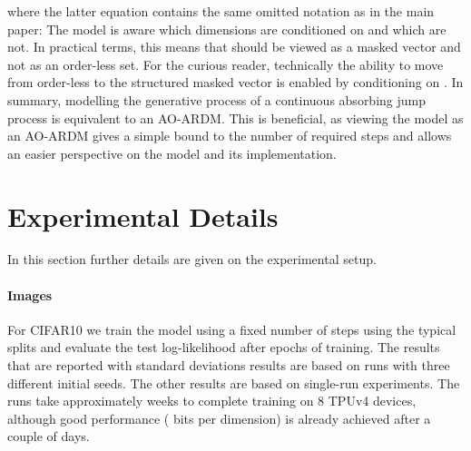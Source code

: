 \documentclass{article} \usepackage{iclr2022_conference,times}
\begin{document}
where the latter equation contains the same omitted notation as in the main paper: The model is aware which dimensions are conditioned on and which are not. In practical terms, this means that  should be viewed as a masked vector and not as an order-less set. For the curious reader, technically the ability to move from order-less to the structured masked vector is enabled by conditioning on . In summary, modelling the generative process of a continuous absorbing jump process is equivalent to an AO-ARDM. This is beneficial, as viewing the model as an AO-ARDM gives a simple bound to the number of required steps and allows an easier perspective on the model and its implementation.
 
\section{Experimental Details}
\label{app:experimental_details}

In this section further details are given on the experimental setup.

\paragraph{Images}
For CIFAR10 \citep{krizhevsky2009learning} we train the model using a fixed number of steps using the typical splits and evaluate the test log-likelihood after  epochs of training. The results that are reported with standard deviations results are based on runs with three different initial seeds. The other results are based on single-run experiments. The runs take approximately  weeks to complete training on 8 TPUv4 devices, although good performance ( bits per dimension) is already achieved after a couple of days.
\end{document}

